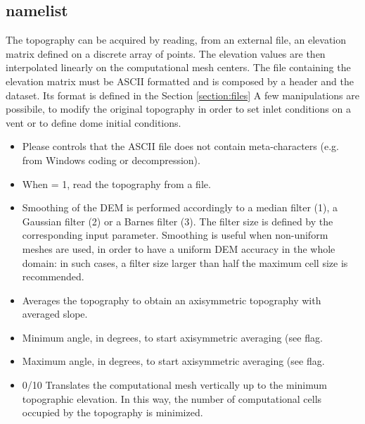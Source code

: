 \subsection{ namelist}
The topography can be acquired by reading, from an external file,
 an elevation matrix defined on a discrete array of points. 
The elevation values are then interpolated
linearly on the computational mesh centers. 
The file containing the elevation matrix must be ASCII formatted and is 
composed by a header and the dataset. Its format is defined in the
Section \ref{section:files}
A few manipulations are possibile, to modify the original topography
in order to set inlet conditions on a vent or to define dome initial
conditions.

\begin{itemize}
\item
{}
{Please controls that the ASCII file does not contain meta-characters (e.g. from Windows coding or decompression).}

\item
{}
{When  = 1, read the topography from a file.}

\item
{}
{Smoothing of the DEM is performed accordingly to a median filter (1), a 
Gaussian filter (2) or a Barnes filter (3). The filter size is defined
by the corresponding input parameter. Smoothing is useful when
non-uniform meshes are used, in order to have a uniform DEM accuracy
in the whole domain: in such cases, a filter size larger than half the 
maximum cell size is recommended.}

\item
{}
{Averages the topography to obtain an axisymmetric topography with
averaged slope.}

\item
{}
{Minimum angle, in degrees, to start axisymmetric averaging (see 
flag.}

\item
{}
{Maximum angle, in degrees, to start axisymmetric averaging (see 
flag.}

\item
{} {0/1}{0}
{Translates the computational mesh vertically up to the minimum topographic elevation. In this way, the number of computational cells occupied by the 
topography is minimized.}


\end{itemize}
